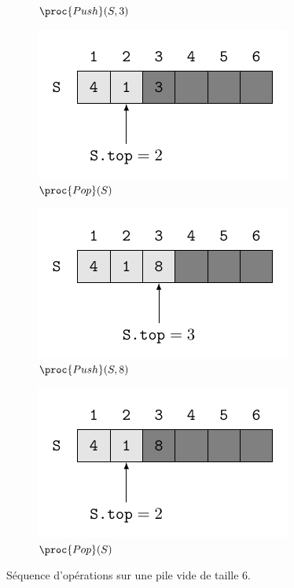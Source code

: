 \begin{description}
\begin{ex}
\begin{figure}[H]
\begin{subfigure}[t]{.45\textwidth}
        \caption{$\proc{Push}(S,3)$}\label{fig:10_1-1_3}
      \end{subfigure}
      \begin{subfigure}[t]{.45\textwidth}
        \centering
        \includegraphics[scale=1]{img/10_1-1/10_1-1_4.pdf}
        \caption{$\proc{Pop}(S)$}\label{fig:10_1-1_4}
      \end{subfigure}
      \begin{subfigure}[t]{.45\textwidth}
        \centering
        \includegraphics[scale=1]{img/10_1-1/10_1-1_5.pdf}
        \caption{$\proc{Push}(S,8)$}\label{fig:10_1-1_5}
      \end{subfigure}
      \begin{subfigure}[t]{.45\textwidth}
        \centering
        \includegraphics[scale=1]{img/10_1-1/10_1-1_6.pdf}
        \caption{$\proc{Pop}(S)$}\label{fig:10_1-1_6}
      \end{subfigure}
      \caption{Séquence d'opérations sur une pile vide de taille 6.} 
    \end{figure}
\end{ex}
 \textit{}
 \textit{}
 \textit{}
 \textit{}
 \textit{}
 \textit{}


\end{description}
